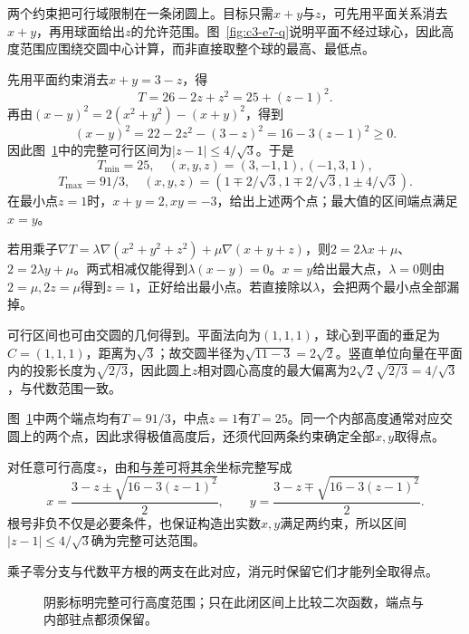\begin{solution}
两个约束把可行域限制在一条闭圆上。目标只需$x+y$与$z$，可先用平面关系消去$x+y$，再用球面给出$z$的允许范围。图~\ref{fig:c3-e7-q}说明平面不经过球心，因此高度范围应围绕交圆中心计算，而非直接取整个球的最高、最低点。


先用平面约束消去$x+y=3-z$，得
\[T=26-2z+z^2=25+(z-1)^2.\]
再由$(x-y)^2=2(x^2+y^2)-(x+y)^2$，得到
\[(x-y)^2=22-2z^2-(3-z)^2=16-3(z-1)^2\ge0.
\]
因此图~\ref{fig:c3-e7-s}中的完整可行区间为$|z-1|\le4/\sqrt3$。于是
\[\boxed{T_{\min}=25,\quad (x,y,z)=(3,-1,1),(-1,3,1)},\]
\[\boxed{T_{\max}=91/3,\quad
(x,y,z)=(1\mp2/\sqrt3,1\mp2/\sqrt3,1\pm4/\sqrt3)}.
\]
在最小点$z=1$时，$x+y=2,xy=-3$，给出上述两个点；最大值的区间端点满足$x=y$。

若用乘子$\nabla T=\lambda\nabla(x^2+y^2+z^2)+\mu\nabla(x+y+z)$，则$2=2\lambda x+\mu$、$2=2\lambda y+\mu$。两式相减仅能得到$\lambda(x-y)=0$。$x=y$给出最大点，$\lambda=0$则由$2=\mu,2z=\mu$得到$z=1$，正好给出最小点。若直接除以$\lambda$，会把两个最小点全部漏掉。


可行区间也可由交圆的几何得到。平面法向为$(1,1,1)$，球心到平面的垂足为$C=(1,1,1)$，距离为$\sqrt3$；故交圆半径为$\sqrt{11-3}=2\sqrt2$。竖直单位向量在平面内的投影长度为$\sqrt{2/3}$，因此圆上$z$相对圆心高度的最大偏离为$2\sqrt2\sqrt{2/3}=4/\sqrt3$，与代数范围一致。

图~\ref{fig:c3-e7-s}中两个端点均有$T=91/3$，中点$z=1$有$T=25$。同一个内部高度通常对应交圆上的两个点，因此求得极值高度后，还须代回两条约束确定全部$x,y$取得点。

对任意可行高度$z$，由和与差可将其余坐标完整写成
\[x=\frac{3-z\pm\sqrt{16-3(z-1)^2}}2,\qquad
 y=\frac{3-z\mp\sqrt{16-3(z-1)^2}}2.\]
根号非负不仅是必要条件，也保证构造出实数$x,y$满足两约束，所以区间$|z-1|\le4/\sqrt3$确为完整可达范围。

乘子零分支与代数平方根的两支在此对应，消元时保留它们才能列全取得点。

\begin{figure}[H]\centering
{}
\caption{阴影标明完整可行高度范围；只在此闭区间上比较二次函数，端点与内部驻点都须保留。}\label{fig:c3-e7-s}
\end{figure}
\end{solution}

